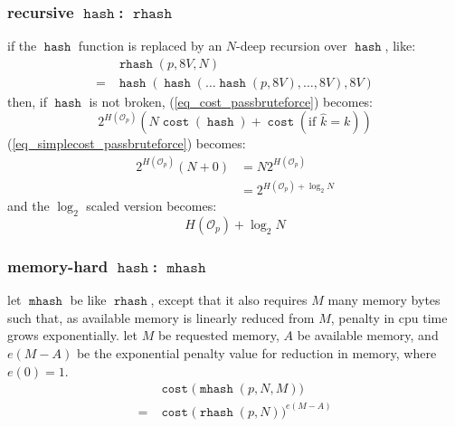 \documentclass[twocolumn]{article}
\DeclareMathOperator{\hash}{\mathtt{hash}}
\DeclareMathOperator{\rhash}{\mathtt{rhash}}
\DeclareMathOperator{\mhash}{\mathtt{mhash}}
\DeclareMathOperator{\cost}{\mathtt{cost}}
\begin{document}
\subsubsection{recursive $\hash$: $\rhash$}
if the $\hash$ function is replaced by an $N$-deep recursion over $\hash$,
like:
\[
    \begin{split}
        & \rhash(p, 8V, N) \\
    ={} &  \hash(\hash(\ldots\hash(p, 8V), \ldots, 8V), 8V)
    \end{split}
\]
then, if $\hash$ is not broken,  (\ref{eq_cost_passbruteforce}) becomes:
\begin{equation}\label{eq_cost_passbruteforce_N}
    2^{H(\mathcal{O}_p)} \left(
        N\cost(\hash) + \cost(\text{if } \hat k = k)
    \right)
\end{equation}
(\ref{eq_simplecost_passbruteforce}) becomes:
\begin{equation}\label{eq_simplecost_passbruteforce_N}
    \begin{split}
    2^{H(\mathcal{O}_p)} (N+0) &= N2^{H(\mathcal{O}_p)} \\
                  &= 2^{H(\mathcal{O}_p) + \log_2 N}
    \end{split}
\end{equation}
and the $\log_2$ scaled version becomes:
\begin{equation}\label{eq_pass_cavemanentropy_rhash}
    H(\mathcal{O}_p) + \log_2 N
\end{equation}

\subsubsection{memory-hard $\hash$: $\mhash$}
let $\mhash$ be like $\rhash$, except that it also requires $M$ many memory
bytes such that, as available memory is linearly reduced from $M$, penalty
in cpu time grows exponentially.  let $M$ be requested memory, $A$ be
available memory, and $e(M - A)$ be the exponential penalty value for
reduction in memory, where $e(0) = 1$.
\begin{equation}
    \begin{split}
        & \cost\Big(\mhash(p, N, M)\Big) \\
    ={} & \cost\Big(\rhash(p, N)\Big)^{e(M-A)}
    \end{split}
\end{equation}
\end{document}
